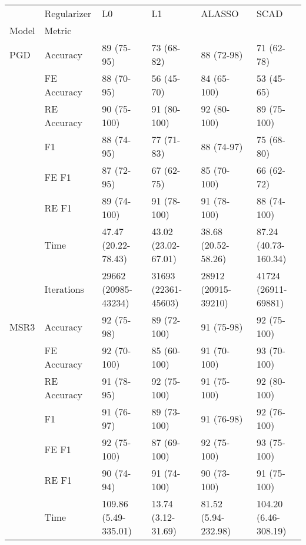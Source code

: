 \begin{tabular}{llllll}
\toprule
          & Regularizer &                    L0 &                   L1 &               ALASSO &                  SCAD \\
Model & Metric &                       &                      &                      &                       \\
\midrule
PGD & Accuracy &            89 (75-95) &           73 (68-82) &           88 (72-98) &            71 (62-78) \\
          & FE Accuracy &            88 (70-95) &           56 (45-70) &          84 (65-100) &            53 (45-65) \\
          & RE Accuracy &           90 (75-100) &          91 (80-100) &          92 (80-100) &           89 (75-100) \\
          & F1 &            88 (74-95) &           77 (71-83) &           88 (74-97) &            75 (68-80) \\
          & FE F1 &            87 (72-95) &           67 (62-75) &          85 (70-100) &            66 (62-72) \\
          & RE F1 &           89 (74-100) &          91 (78-100) &          91 (78-100) &           88 (74-100) \\
          & Time &   47.47 (20.22-78.43) &  43.02 (23.02-67.01) &  38.68 (20.52-58.26) &  87.24 (40.73-160.34) \\
          & Iterations &   29662 (20985-43234) &  31693 (22361-45603) &  28912 (20915-39210) &   41724 (26911-69881) \\
\hline
MSR3 & Accuracy &            92 (75-98) &          89 (72-100) &           91 (75-98) &           92 (75-100) \\
          & FE Accuracy &           92 (70-100) &          85 (60-100) &          91 (70-100) &           93 (70-100) \\
          & RE Accuracy &            91 (78-95) &          92 (75-100) &          91 (75-100) &           92 (80-100) \\
          & F1 &            91 (76-97) &          89 (73-100) &           91 (76-98) &           92 (76-100) \\
          & FE F1 &           92 (75-100) &          87 (69-100) &          92 (75-100) &           93 (75-100) \\
          & RE F1 &            90 (74-94) &          91 (74-100) &          90 (73-100) &           91 (75-100) \\
          & Time &  109.86 (5.49-335.01) &   13.74 (3.12-31.69) &  81.52 (5.94-232.98) &  104.20 (6.46-308.19) \\

\end{tabular}
